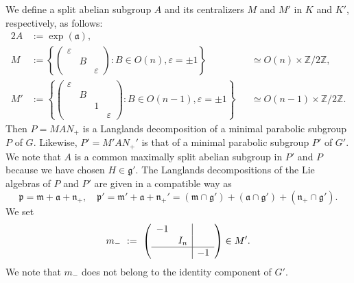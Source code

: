 We define a split abelian subgroup $A$
 and its centralizers $M$ and $M'$ in $K$ and $K'$, 
 respectively, 
 as follows:
\begin{alignat*}{2}
A&:= \exp ({\mathfrak {a}}), 
&&
\\
M&:=\left\{ \begin{pmatrix} \varepsilon & & \\ &  B & \\ & & \varepsilon \end{pmatrix} : B \in O(n), \varepsilon = \pm 1\right\}
&& \simeq O(n) \times {\mathbb{Z}}/2 {\mathbb{Z}}, 
\\
M'
&:=\left\{ \begin{pmatrix} \varepsilon & & & \\ &  B & & \\ & & 1 & \\ & & & \varepsilon\end{pmatrix} : B \in O(n-1), \varepsilon = \pm 1\right\}
&& \simeq O(n-1) \times {\mathbb{Z}}/2 {\mathbb{Z}}.  
\end{alignat*}
Then 
$P= MAN_+$ is a Langlands decomposition
 of a minimal parabolic subgroup $P$ of $G$.  
Likewise,
 $P'= M' AN_+'$ is that
 of a minimal parabolic subgroup $P'$ of $G'$.  
We note
 that $A$ is a common maximally split abelian subgroup
 in $P'$ and $P$
 because we have chosen $H \in {\mathfrak {g}}'$.  
The Langlands decompositions
 of the Lie algebras of $P$ and $P'$
 are given in a compatible way 
 as 
\[
{\mathfrak {p}}={\mathfrak {m}}+{\mathfrak {a}}+{\mathfrak {n}}_+, 
\quad
 {\mathfrak {p}}'={\mathfrak {m}}'+{\mathfrak {a}}+{\mathfrak {n}}_+'
 =({\mathfrak {m}} \cap {\mathfrak {g}}') + ({\mathfrak {a}} \cap {\mathfrak {g}}')+({\mathfrak {n}}_+ \cap {\mathfrak {g}}').  
\]
We set 
\begin{equation}\label{eqn:m-}
m_- \ := \ 
  \left(
   \begin{array}{cc|c}
      -1  &        &   \\
        & I_{n}&      \\
           \hline
        &        &      -1
    \end{array}
    \right)\in M'.  
   \end{equation}
We note
 that $m_-$ does not belong to the identity component
 of $G'$.  


